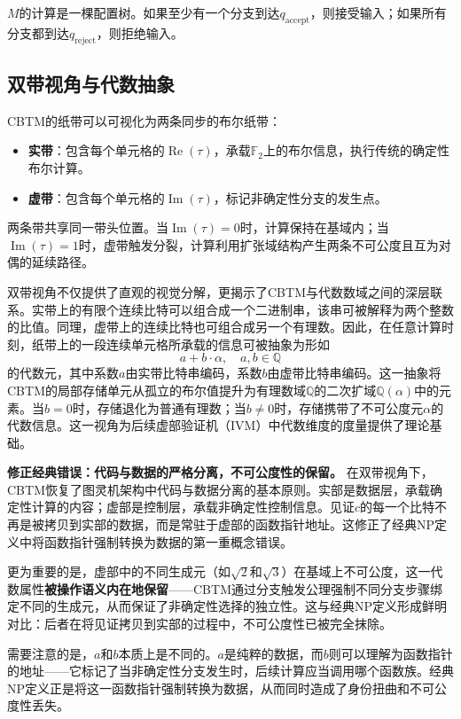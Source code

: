 \documentclass{ctexart}
\begin{document}
	$M$的计算是一棵配置树。如果至少有一个分支到达$q_{\text{accept}}$，则接受输入；如果所有分支都到达$q_{\text{reject}}$，则拒绝输入。
	
	\subsection{双带视角与代数抽象}
	
	CBTM的纸带可以可视化为两条同步的布尔纸带：
	\begin{itemize}
		\item \textbf{实带}：包含每个单元格的$\operatorname{Re}(\tau)$，承载$\mathbb{F}_2$上的布尔信息，执行传统的确定性布尔计算。
		\item \textbf{虚带}：包含每个单元格的$\operatorname{Im}(\tau)$，标记非确定性分支的发生点。
	\end{itemize}
	两条带共享同一带头位置。当$\operatorname{Im}(\tau) = 0$时，计算保持在基域内；当$\operatorname{Im}(\tau) = 1$时，虚带触发分裂，计算利用扩张域结构产生两条不可公度且互为对偶的延续路径。
	
	双带视角不仅提供了直观的视觉分解，更揭示了CBTM与代数数域之间的深层联系。实带上的有限个连续比特可以组合成一个二进制串，该串可被解释为两个整数的比值。同理，虚带上的连续比特也可组合成另一个有理数。因此，在任意计算时刻，纸带上的一段连续单元格所承载的信息可被抽象为形如
	\[
	a + b \cdot \alpha, \quad a, b \in \mathbb{Q}
	\]
	的代数元，其中系数$a$由实带比特串编码，系数$b$由虚带比特串编码。这一抽象将CBTM的局部存储单元从孤立的布尔值提升为有理数域$\mathbb{Q}$的二次扩域$\mathbb{Q}(\alpha)$中的元素。当$b=0$时，存储退化为普通有理数；当$b \neq 0$时，存储携带了不可公度元$\alpha$的代数信息。这一视角为后续虚部验证机（IVM）中代数维度的度量提供了理论基础。
	
	\textbf{修正经典错误：代码与数据的严格分离，不可公度性的保留。} 在双带视角下，CBTM恢复了图灵机架构中代码与数据分离的基本原则。实部是数据层，承载确定性计算的内容；虚部是控制层，承载非确定性控制信息。见证$c$的每一个比特不再是被拷贝到实部的数据，而是常驻于虚部的函数指针地址。这修正了经典NP定义中将函数指针强制转换为数据的第一重概念错误。
	
	更为重要的是，虚部中的不同生成元（如$\sqrt{2}$和$\sqrt{3}$）在基域上不可公度，这一代数属性\textbf{被操作语义内在地保留}——CBTM通过分支触发公理强制不同分支步骤绑定不同的生成元，从而保证了非确定性选择的独立性。这与经典NP定义形成鲜明对比：后者在将见证拷贝到实部的过程中，不可公度性已被完全抹除。
	
	需要注意的是，$a$和$b$本质上是不同的。$a$是纯粹的数据，而$b$则可以理解为函数指针的地址——它标记了当非确定性分支发生时，后续计算应当调用哪个函数族。经典NP定义正是将这一函数指针强制转换为数据，从而同时造成了身份扭曲和不可公度性丢失。
	
\end{document}
